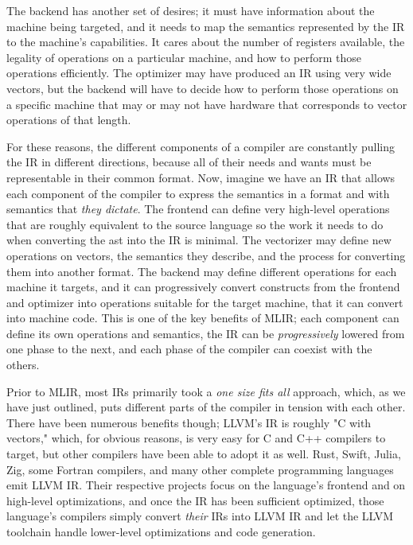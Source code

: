The backend has another set of desires; it must have information about the
machine being targeted, and it needs to map the semantics represented by the IR
to the machine's capabilities. It cares about the number of registers available,
the legality of operations on a particular machine, and how to perform those operations efficiently.
The optimizer may have produced an IR using very wide vectors, but the
backend will have to decide how to perform those operations on a specific machine
that may or may not have hardware that corresponds to vector operations of that length.

For these reasons, the different components of a compiler are constantly pulling
the IR in different directions, because all of their needs and wants must be
representable in their common format.
Now, imagine we have an IR that allows each component of the compiler to express
the semantics in a format and with semantics that \textit{they dictate}.
The frontend can define very high-level operations that are roughly equivalent
to the source language so the work it needs to do when converting the \gls{ast}
into the IR is minimal.
The vectorizer may define new operations on vectors, the semantics they
describe, and the process for converting them into another format.
The backend may define different operations for each machine it targets,
and it can progressively convert constructs from the frontend and optimizer
into operations suitable for the target machine, that it can convert into
machine code.
This is one of the key benefits of MLIR; each component can define its own
operations and semantics, the IR can be \textit{progressively} lowered from
one phase to the next, and each phase of the compiler can coexist with the others.

Prior to MLIR, most IRs primarily took a \textit{one size fits all} approach,
which, as we have just outlined, puts different parts of the compiler in tension with each other.
There have been numerous benefits though; LLVM's IR is roughly "C with vectors,"
which, for obvious reasons, is very easy for C and C++ compilers to target,
but other compilers have been able to adopt it as well.
Rust, Swift, Julia, Zig, some Fortran compilers, and many other complete programming languages
emit LLVM IR. Their respective projects focus on the language's
frontend and on high-level optimizations, and once the IR has been sufficient
optimized, those language's compilers simply convert \textit{their} IRs into
LLVM IR and let the LLVM toolchain handle lower-level optimizations and code generation.


